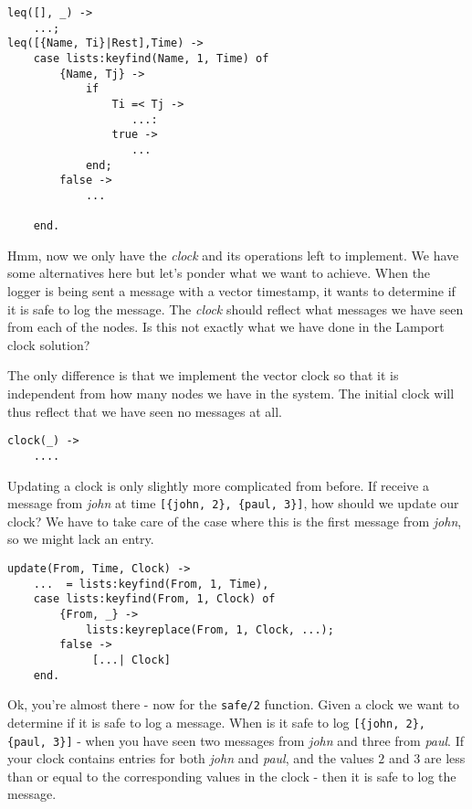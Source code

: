 \documentclass[a4paper,11pt]{article}
\begin{document}
\begin{verbatim}
leq([], _) ->
    ...;
leq([{Name, Ti}|Rest],Time) ->
    case lists:keyfind(Name, 1, Time) of
        {Name, Tj} ->
            if 
                Ti =< Tj ->
                   ...:
                true ->
                   ...
            end;
        false ->
            ...
            
    end.
\end{verbatim}

Hmm, now we only have the {\em clock} and its operations left to
implement. We have some alternatives here but let's ponder what we
want to achieve. When the logger is being sent a message with a vector
timestamp, it wants to determine if it is safe to log the
message. The {\em clock} should reflect what messages we have seen
from each of the nodes. Is this not exactly what we have done in the
Lamport clock solution?

The only difference is that we implement the vector clock so that it
is independent from how many nodes we have in the system. The initial
clock will thus reflect that we have seen no messages at all.

\begin{verbatim}
clock(_) ->         
    ....
\end{verbatim}

Updating a clock is only slightly more complicated from before. If
receive a message from {\em john} at time {\tt [\{john, 2\}, \{paul,
    3\}]}, how should we update our clock? We have to take care of the
case where this is the first message from {\em john}, so we might lack
an entry.

\begin{verbatim}
update(From, Time, Clock) -> 
    ...  = lists:keyfind(From, 1, Time),
    case lists:keyfind(From, 1, Clock) of
        {From, _} -> 
            lists:keyreplace(From, 1, Clock, ...);
        false ->
             [...| Clock]
    end.
\end{verbatim}

Ok, you're almost there - now for the {\tt safe/2} function. Given a
clock we want to determine if it is safe to log a message. When is it
safe to log {\tt [\{john, 2\}, \{paul, 3\}]} - when you have seen two
messages from {\em john} and three from {\em paul}. If your clock
contains entries for both {\em john} and {\em paul}, and the values
$2$ and $3$ are less than or equal to the corresponding values in the
clock - then it is safe to log the message.
\end{document}
